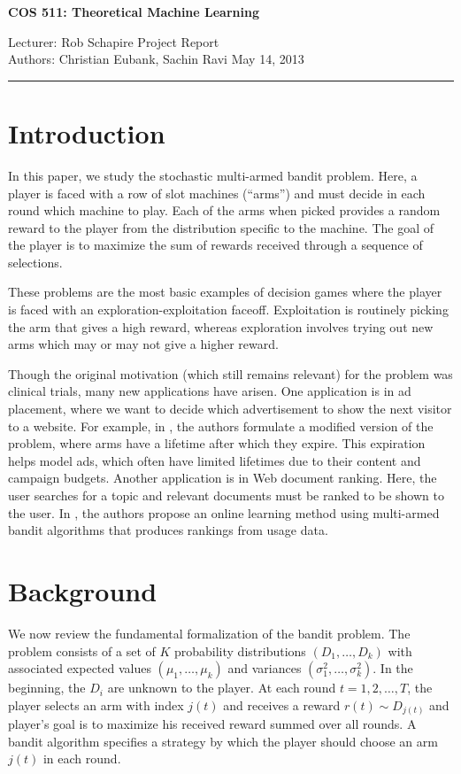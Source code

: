\documentclass[12pt]{article}
\begin{document}
\thispagestyle{empty}

\begin{center}
\bf\large COS 511: Theoretical Machine Learning
\end{center}

\noindent
Lecturer: Rob Schapire   %
\hfill
Project Report              %
\\
Authors: Christian Eubank, Sachin Ravi                %
\hfill
May 14, 2013           %

\noindent
\rule{\textwidth}{1pt}

\medskip

\section{Introduction}
In this paper, we study the stochastic multi-armed bandit problem. Here, a player is  
faced with a row of slot machines (``arms'') and must decide in each round which machine
to play.  Each of the arms when picked provides a random reward to the player from the distribution
specific to the machine. The goal of the player is to maximize the sum of rewards received through a
sequence of selections.  

These problems are the most basic examples of decision games where the player is faced with an 
exploration-exploitation faceoff.  Exploitation is routinely picking the arm that gives a high reward,
whereas exploration involves trying out new arms which may or may not give a higher reward. 

Though the original motivation (which still remains relevant) for the problem was clinical trials, many 
new applications have arisen.  One application is in ad placement, where we want to decide which advertisement
to show the next visitor to a website.  For example, in \cite{Chakrabarti}, the authors formulate a modified version
of the problem, where arms have a lifetime after which they expire.  This expiration helps model ads, which often 
have limited lifetimes due to their content and campaign budgets.  Another application is in Web document ranking.  
Here, the user searches for a topic and relevant documents must be ranked to be shown to the user.  In \cite{Radlinski}, 
the authors propose an online learning method using multi-armed bandit algorithms that produces rankings from usage data.   

\section{Background}
We now review the fundamental formalization of the bandit problem. The problem consists of a set of $K$ probability distributions
$(D_1, \ldots, D_k)$ with associated expected values $(\mu_1, \ldots, \mu_k)$ and variances $(\sigma^2_1, \ldots, \sigma^2_k)$.
In the beginning, the $D_i$ are unknown to the player.  At each round $t = 1,2,\ldots,T$, the player selects an arm with index $j(t)$
and receives a reward $r(t) \sim D_{j(t)}$ and player's goal is to maximize his received reward summed over all rounds.  A bandit algorithm
specifies a strategy by which the player should choose an arm $j(t)$ in each round.
\end{document}
